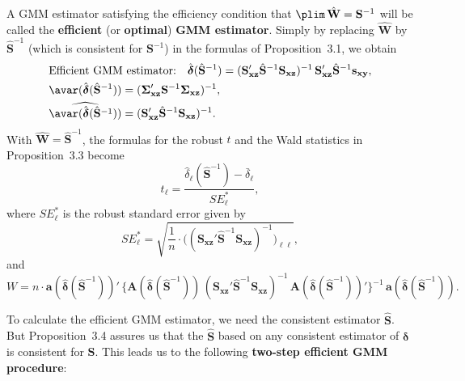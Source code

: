 A GMM estimator satisfying the efficiency condition that
$\plim\, \hat{\mathbf{W}} = \mathbf{S}^{-1}$ will be called the \textbf{efficient} (or \textbf{optimal})
\textbf{GMM estimator}.  Simply by replacing $\hat{\mathbf{W}}$ by $\hat{\mathbf{S}}^{-1}$ (which is
consistent for $\mathbf{S}^{-1}$) in the formulas of Proposition~3.1, we obtain
\begin{align}
  &\text{Efficient GMM estimator:} \quad
  \hat{\boldsymbol{\delta}}(\hat{\mathbf{S}}^{-1})
  = (\mathbf{S}_{\mathbf{xz}}' \hat{\mathbf{S}}^{-1} \mathbf{S}_{\mathbf{xz}})^{-1}\,
    \mathbf{S}_{\mathbf{xz}}' \hat{\mathbf{S}}^{-1} \mathbf{s}_{\mathbf{xy}},
  \label{eq:3.5.12} \\
  &\avar(\hat{\boldsymbol{\delta}}(\hat{\mathbf{S}}^{-1}))
  = (\boldsymbol{\Sigma}_{\mathbf{xz}}' \mathbf{S}^{-1}
     \boldsymbol{\Sigma}_{\mathbf{xz}})^{-1},
  \label{eq:3.5.13} \\
  &\widehat{\avar(\hat{\boldsymbol{\delta}}(\hat{\mathbf{S}}^{-1}))}
  = (\mathbf{S}_{\mathbf{xz}}' \hat{\mathbf{S}}^{-1}
     \mathbf{S}_{\mathbf{xz}})^{-1}.
  \label{eq:3.5.14}
\end{align}
With $\hat{\mathbf{W}} = \hat{\mathbf{S}}^{-1}$, the formulas for the robust $t$ and the Wald statistics
in Proposition~3.3 become
\begin{equation}
  t_\ell = \frac{\hat{\delta}_\ell(\hat{\mathbf{S}}^{-1}) - \bar{\delta}_\ell}
                 {SE_\ell^*},
  \label{eq:3.5.15}
\end{equation}
where $SE_\ell^*$ is the robust standard error given by
\[
  SE_\ell^* = \sqrt{\frac{1}{n} \cdot
    \bigl((\mathbf{S}_{\mathbf{xz}}' \hat{\mathbf{S}}^{-1}
    \mathbf{S}_{\mathbf{xz}})^{-1}\bigr)_{\!\ell\ell}},
\]
and
\begin{equation}
  W = n \cdot \mathbf{a}(\hat{\boldsymbol{\delta}}(\hat{\mathbf{S}}^{-1}))'\,
  \bigl\{\mathbf{A}(\hat{\boldsymbol{\delta}}(\hat{\mathbf{S}}^{-1}))\,
  (\mathbf{S}_{\mathbf{xz}}' \hat{\mathbf{S}}^{-1} \mathbf{S}_{\mathbf{xz}})^{-1}\,
  \mathbf{A}(\hat{\boldsymbol{\delta}}(\hat{\mathbf{S}}^{-1}))'\bigr\}^{-1}\,
  \mathbf{a}(\hat{\boldsymbol{\delta}}(\hat{\mathbf{S}}^{-1})).
  \label{eq:3.5.16}
\end{equation}

To calculate the efficient GMM estimator, we need the consistent estimator
$\hat{\mathbf{S}}$.  But Proposition~3.4 assures us that the $\hat{\mathbf{S}}$ based on any consistent
estimator of $\boldsymbol{\delta}$ is consistent for $\mathbf{S}$.  This leads us to the following
\textbf{two-step efficient GMM procedure}:

